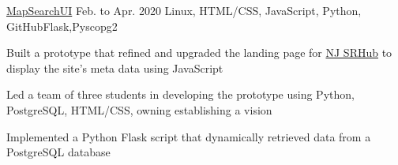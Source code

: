 \begin{cventry}
    {\href{https://github.com/abhivemp/map-search-UI}{MapSearchUI}}{}
    {Feb. to Apr. 2020}
    {Linux, HTML/CSS, JavaScript, Python, GitHub}{Flask,Pyscopg2}
    \begin{cvitems}
        \item Built a prototype that refined and upgraded the landing page for {\href{www.srhub.org}{NJ SRHub}} to display the site's meta data using JavaScript 
        \item Led a team of three students in developing the prototype using Python, PostgreSQL, HTML/CSS, owning establishing a vision
        \item Implemented a Python Flask script that dynamically retrieved data from a PostgreSQL database
        
    \end{cvitems}
\end{cventry}

